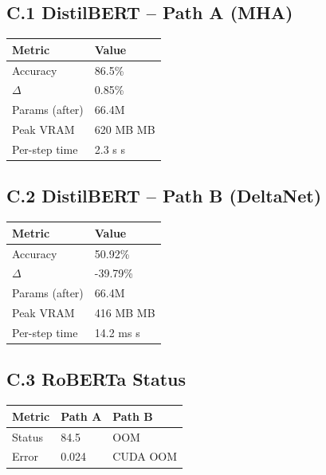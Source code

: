 \subsection{C.1 DistilBERT -- Path A (MHA)}

\begin{table}[H]
\centering
\small
\begin{tabular}{ll}
\toprule
\textbf{Metric} & \textbf{Value} \\
\midrule
Accuracy & 86.5\% \\
$\Delta$ & 0.85\% \\
Params (after) & 66.4M \\
Peak VRAM & 620 MB MB \\
Per-step time & 2.3 s s \\
\bottomrule
\end{tabular}
\end{table}

\subsection{C.2 DistilBERT -- Path B (DeltaNet)}

\begin{table}[H]
\centering
\small
\begin{tabular}{ll}
\toprule
\textbf{Metric} & \textbf{Value} \\
\midrule
Accuracy & 50.92\% \\
$\Delta$ & -39.79\% \\
Params (after) & 66.4M \\
Peak VRAM & 416 MB MB \\
Per-step time & 14.2 ms s \\
\bottomrule
\end{tabular}
\end{table}

\subsection{C.3 RoBERTa Status}

\begin{table}[H]
\centering
\small
\begin{tabular}{lll}
\toprule
\textbf{Metric} & \textbf{Path A} & \textbf{Path B} \\
\midrule
Status & 84.5 & OOM \\
Error & 0.024 & CUDA OOM \\
\bottomrule
\end{tabular}
\end{table}

